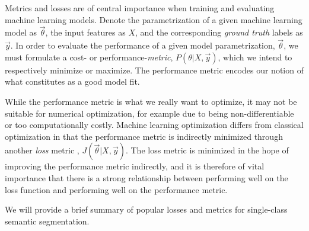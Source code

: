 Metrics and losses are of central importance when training and evaluating machine learning models.
Denote the parametrization of a given machine learning model as $\vec{\theta}$, the input features as $X$, and the corresponding \textit{ground truth} labels as $\vec{y}$.
In order to evaluate the performance of a given model parametrization, $\vec{\theta}$, we must formulate a cost- or performance-\textit{metric}, $P(\theta | X, \vec{y})$, which we intend to respectively minimize or maximize.
The performance metric encodes our notion of what constitutes as a good model fit.

While the performance metric is what we really want to optimize, it may not be suitable for numerical optimization, for example due to being non-differentiable or too computationally costly.
Machine learning optimization differs from classical optimization in that the performance metric is indirectly minimized through another \textit{loss} metric \cite[p.~272]{goodfellow}, $J(\vec{\theta} | X, \vec{y})$.
The loss metric is minimized in the hope of improving the performance metric indirectly, and it is therefore of vital importance that there is a strong relationship between performing well on the loss function and performing well on the performance metric.

We will provide a brief summary of popular losses and metrics for single-class semantic segmentation.
